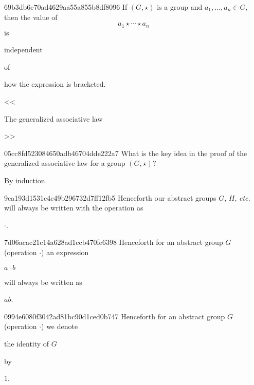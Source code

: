 \begin{note}{69b3db6e70ad4629aa55a855b8df8096}
    If \({ (G, \star) }\) is a group and \({ a_1, \ldots, a_n \in G }\), then
    the value of
    \[
        a_1 \star \cdots \star a_n
    \]
    is \begin{icloze}{2}independent\end{icloze} of \begin{icloze}{1}how the expression is bracketed.\end{icloze}

    \begin{center}
        \tiny
        <<\begin{icloze}{3}The generalized associative law\end{icloze}>>
    \end{center}
\end{note}

\begin{note}{05cc8fd523084650adb46704dde222a7}
    What is the key idea in the proof of the generalized associative law for a group \({ (G, \star) }\)?

    \begin{cloze}{1}
        By induction.
    \end{cloze}
\end{note}

\begin{note}{9ca193d1531c4c49b296732d7ff12fb5}
    Henceforth our abstract groups \({ G }\), \({ H }\), \textit{etc.} will always be written with the operation as \begin{icloze}{1}\({ \cdot }\).\end{icloze}
\end{note}

\begin{note}{7d06acac21c14a628ad1ccb470fe6398}
    Henceforth for an abstract group \({ G }\) (operation \({ \cdot }\))
    an expression \begin{icloze}{2}\({ a \cdot b }\)\end{icloze} will always be written as \begin{icloze}{1}\({ ab }\).\end{icloze}
\end{note}

\begin{note}{0994e6080f3042ad81bc90d1ced0b747}
    Henceforth for an abstract group \({ G }\) (operation \({ \cdot }\))
    we denote \begin{icloze}{2}the identity of \({ G }\)\end{icloze} by \begin{icloze}{1}\({ 1 }\).\end{icloze}
\end{note}

